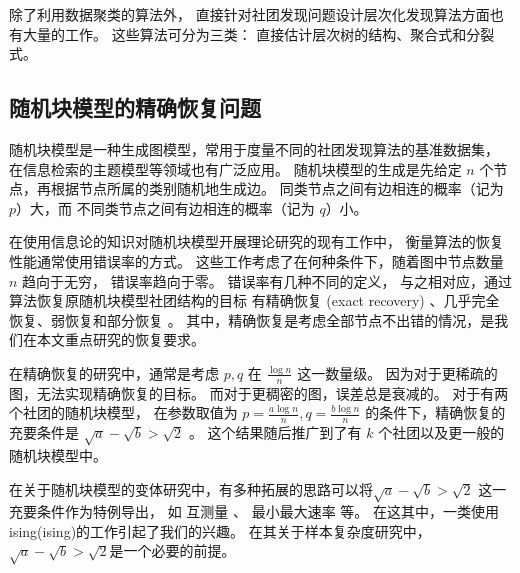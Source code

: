 除了利用数据聚类的算法外，
直接针对社团发现问题设计层次化发现算法方面也有大量的工作。
这些算法可分为三类\cite{li2022hierarchical}：
直接估计层次树的结构\cite{arenas2006synchronization, blundell2013bhcd}、聚合式\cite{clauset2004finding}和分裂式\cite{girvan2002community, dasgupta2016cost}。

\subsection{随机块模型的精确恢复问题}
随机块模型是一种生成图模型，常用于度量不同的社团发现算法的基准数据集，
在信息检索的主题模型等领域也有广泛应用\cite{Gerlach_2018}。
随机块模型的生成是先给定 $n$ 个节点，再根据节点所属的类别随机地生成边。
同类节点之间有边相连的概率（记为 $p$）大，而
不同类节点之间有边相连的概率（记为 $q$）小。\cite{abbe2017community}

在使用信息论的知识对随机块模型开展理论研究的现有工作中，
衡量算法的恢复性能通常使用错误率的方式。
这些工作考虑了在何种条件下，随着图中节点数量 $n$ 趋向于无穷，
错误率趋向于零。
错误率有几种不同的定义，
与之相对应，通过算法恢复原随机块模型社团结构的目标
有精确恢复 (exact recovery) 、几乎完全恢复、弱恢复和部分恢复
\cite{abbe2017community}。
其中，精确恢复是考虑全部节点不出错的情况，是我们在本文重点研究的恢复要求。


在精确恢复的研究中，通常是考虑 $p, q$ 在 $\frac{\log n}{n}$ 这一数量级。
因为对于更稀疏的图，无法实现精确恢复的目标。
而对于更稠密的图，误差总是衰减的。
对于有两个社团的随机块模型，
在参数取值为 $p=\frac{a \log n}{n}, q = \frac{b \log n }{n}$
的条件下，精确恢复的充要条件是
$\sqrt{a} - \sqrt{b} > \sqrt{2}$ \cite{abbe2015exact, mossel2016}。
这个结果随后推广到了有 $k$ 个社团以及更一般的随机块模型中\cite{abbe2015community}。

在关于随机块模型的变体研究中，有多种拓展的思路可以将$\sqrt{a} - \sqrt{b} > \sqrt{2}$
这一充要条件作为特例导出，
如 互测量 \cite{chen2016information}、 最小最大速率 \cite{zhang2016} 等。
在这其中，一类使用
\gls{ising}(\glsdesc{ising})的工作引起了我们的兴趣\cite{ye2020exact}。
在其关于样本复杂度研究中，$\sqrt{a} - \sqrt{b} > \sqrt{2}$是一个必要的前提。


